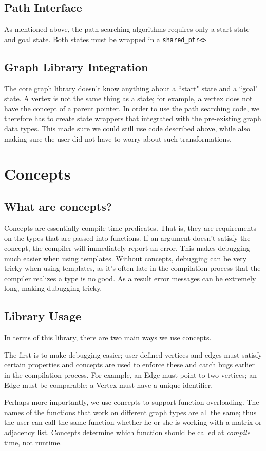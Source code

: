 \documentclass{article}
\begin{document}
\subsection{Path Interface}
As mentioned above, the path searching algorithms requires only a start state and goal state. Both states must be wrapped in a \texttt{shared\_ptr<>}

\subsection{Graph Library Integration}
The core graph library doesn't know anything about a ``start" state and a ``goal" state. A vertex is not the same thing as a state; for example, a vertex does not have the concept of a parent pointer. In order to use the path searching code, we therefore has to create state wrappers that integrated with the pre-existing graph data types. This made sure we could still use code described above, while also making sure the user did not have to worry about such transformations.

\section{Concepts}
\subsection{What are concepts?}
Concepts are essentially compile time predicates. That is, they are requirements on the types that are passed into functions. If an argument doesn't satisfy the concept, the compiler will immediately report an error. This makes debugging much easier when using templates. Without concepts, debugging can be very tricky when using templates, as it's often late in the compilation process that the compiler realizes a type is no good. As a result error messages can be extremely long, making dubugging tricky. 
\subsection{Library Usage}
In terms of this library, there are two main ways we use concepts.
\par
The first is to make debugging easier; user defined vertices and edges must satisfy certain properties and concepts are used to enforce these and catch bugs earlier in the compilation process. For example, an Edge must point to two vertices; an Edge must be comparable; a Vertex must have a unique identifier. 
\par
Perhaps more importantly, we use concepts to support function overloading. The names of the functions that work on different graph types are all the same; thus the user can call the same function whether he or she is working with a matrix or adjacency list. Concepts determine which function should be called at \emph{compile} time, not runtime. 
\end{document}
